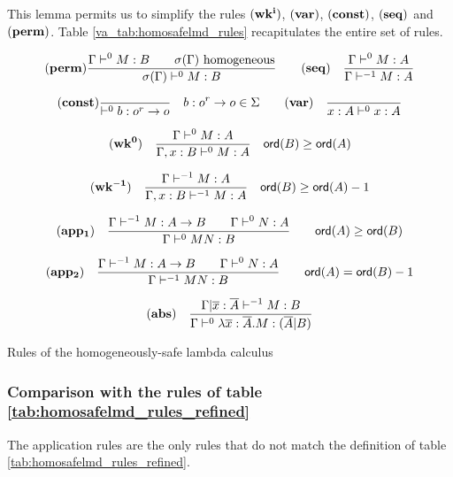 This lemma permits us to simplify the rules $\mathbf{(wk^i)}$,
$\mathbf{(var)}$, $\mathbf{(const)}$, $\mathbf{(seq)}$ and
$\mathbf{(perm)}$. Table \ref{va_tab:homosafelmd_rules} recapitulates
the entire set of rules.

\begin{table}[htbp]
$$  \mathbf{(perm)}
    \frac{\displaystyle  \Gamma \vdash^0 M:B \qquad \sigma(\Gamma)  \hbox{ homogeneous} }{ \sigma(\Gamma) \vdash^0 M : B }
\qquad \mathbf{(seq)} \quad \frac{\displaystyle \Gamma \vdash^{0} M : A}{\Gamma
\vdash^{-1} M : A}
$$

$$
 \mathbf{(const)}
    \frac{\displaystyle }{\vdash^0 b : o^r \rightarrow o} \quad b : o^r \rightarrow o \in \Sigma
\qquad
 \mathbf{(var)} \quad  \frac{\displaystyle }{x : A\vdash^{0} x : A} $$

$$ \mathbf{(wk^{0})} \quad  \frac{\displaystyle \Gamma \vdash^{0} M : A}{\Gamma , x : B \vdash^{0} M : A} \quad {\sf ord}(B) \geq {\sf ord}(A) $$

$$ \mathbf{(wk^{-1})} \quad  \frac{\displaystyle \Gamma \vdash^{-1} M : A}{\Gamma , x : B \vdash^{-1} M : A} \quad {\sf ord}(B) \geq {\sf ord}(A) -1$$


$$ \mathbf{(app_1)} \quad  \frac{\displaystyle \Gamma \vdash^{-1} M : A\rightarrow B
                                        \qquad \Gamma \vdash^{0} N : A }{\Gamma  \vdash^{0} M N : B}
                                    \qquad {\sf ord}(A) \geq {\sf ord}(B)$$

$$ \mathbf{(app_2)} \quad  \frac{\displaystyle \Gamma \vdash^{-1} M : A\rightarrow B
                                        \qquad \Gamma \vdash^{0} N : A
                                   }{\Gamma  \vdash^{-1} M N : B}
                                    \qquad {\sf ord}(A) = {\sf ord}(B) - 1$$

$$ \mathbf{(abs)} \quad  \frac{\displaystyle \Gamma| \overline{x} : \overline{A} \vdash^{-1} M : B}{\Gamma  \vdash^{0} \lambda \overline{x} : \overline{A} . M : (\overline{A}|B)}$$
\caption{Rules of the homogeneously-safe lambda calculus}
\label{va_tab:homosafelmd_rules}
\end{table}

\subsubsection{Comparison with the rules of table \ref{tab:homosafelmd_rules_refined}}

The application rules are the only rules that do not match the
definition of table \ref{tab:homosafelmd_rules_refined}.

